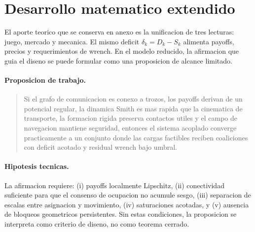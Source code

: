\section{Desarrollo matematico extendido}

El aporte teorico que se conserva en anexo es la unificacion de tres lecturas: juego,
mercado y mecanica. El mismo deficit $\delta_k = D_k-S_k$ alimenta payoffs, precios y
requerimientos de wrench. En el modelo reducido, la afirmacion que guia el diseno se
puede formular como una proposicion de alcance limitado.

\paragraph{Proposicion de trabajo.}

\begin{quote}
Si el grafo de comunicacion es conexo a trozos, los payoffs derivan de un potencial
regular, la dinamica Smith es mas rapida que la cinematica de transporte, la formacion
rigida preserva contactos utiles y el campo de navegacion mantiene seguridad, entonces
el sistema acoplado converge practicamente a un conjunto donde las cargas factibles
reciben coaliciones con deficit acotado y residual wrench bajo umbral.
\end{quote}

\paragraph{Hipotesis tecnicas.}
La afirmacion requiere: (i) payoffs localmente Lipschitz, (ii) conectividad suficiente
para que el consenso de ocupacion no acumule sesgo, (iii) separacion de escalas entre
asignacion y movimiento, (iv) saturaciones acotadas, y (v) ausencia de bloqueos
geometricos persistentes. Sin estas condiciones, la proposicion se interpreta como
criterio de diseno, no como teorema cerrado.

